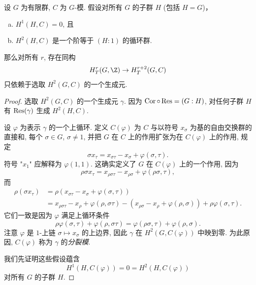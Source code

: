 \begin{theorem}[Tate 定理]\label{thm:ii.3.11}
设 $G$ 为有限群, $C$ 为 $G$-模. 假设对所有 $G$ 的子群 $H$ (包括 $H=G$)，
\begin{enumerate}[(a)]
\item $H^1(H,C)=0$, 且
\item $H^2(H,C)$ 是一个阶等于 $(H:1)$ 的循环群.
\end{enumerate}
那么对所有 $r$, 存在同构
\[
 H_T^r(G,\Z)\to H_T^{r+2}(G,C)
\]
只依赖于选取 $H^2(G,C)$ 的一个生成元.
\end{theorem}

\begin{proof}
选取 $H^2(G,C)$ 的一个生成元 $\gamma$. 因为 $\operatorname{Cor}\circ\operatorname{Res}=(G:H)$, 对任何子群 $H$ 有 $\operatorname{Res}(\gamma)$ 生成 $H^2(H,C)$.

设 $\varphi$ 为表示 $\gamma$ 的一个上循环. 定义 $C(\varphi)$ 为 $C$ 与以符号 $x_\sigma$ 为基的自由交换群的直接和, 每个 $\sigma\in G$, $\sigma\neq 1$, 并把 $G$ 在 $C$ 上的作用扩张为在 $C(\varphi)$ 上的作用, 规定
\[
 \sigma x_\tau=x_{\sigma\tau}-x_\sigma+\varphi(\sigma,\tau).
\]
符号 "$x_1$" 应解释为 $\varphi(1,1)$. 这确实定义了 $G$ 在 $C(\varphi)$ 上的一个作用, 因为
\[
 \rho\sigma x_\tau=x_{\rho\sigma\tau}-x_{\rho\sigma}+\varphi(\rho\sigma,\tau),
\]
而
\[
 \begin{aligned}
 \rho(\sigma x_\tau)&=\rho(x_{\sigma\tau}-x_\sigma+\varphi(\sigma,\tau))\\
 &=x_{\rho\sigma\tau}-x_\rho+\varphi(\rho,\sigma\tau)-(x_{\rho\sigma}-x_\rho+\varphi(\rho,\sigma))+\rho\varphi(\sigma,\tau).
 \end{aligned}
\]
它们一致是因为 $\varphi$ 满足上循环条件
\[
 \rho\varphi(\sigma,\tau)+\varphi(\rho,\sigma\tau)=\varphi(\rho\sigma,\tau)+\varphi(\rho,\sigma).
\]
注意 $\varphi$ 是 $1$-上链 $\sigma\mapsto x_\sigma$ 的上边界, 因此 $\gamma$ 在 $H^2(G,C(\varphi))$ 中映到零. 为此原因, $C(\varphi)$ 称为 $\gamma$ 的\emph{分裂模}.

我们先证明这些假设蕴含
\[
 H^1(H,C(\varphi))=0=H^2(H,C(\varphi))
\]
对所有 $G$ 的子群 $H$.


\end{proof}
